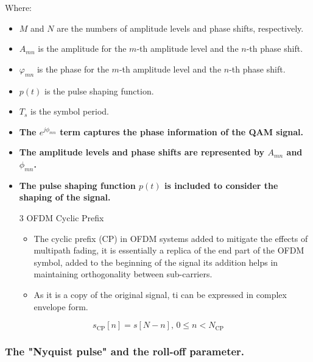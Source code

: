 \documentclass[colorlinks,11pt,a4paper,normalphoto,withhyper,ragged2e]{altareport}
\begin{document}
				Where:
				\begin{itemize}
					\item \(M\) and $N$ are the numbers of amplitude levels and phase shifts, respectively.
					\item \(A_{mn}\) is the amplitude for the \(m\)-th amplitude level and the \(n\)-th phase shift.
					\item \(\varphi_{mn}\) is the phase for the \(m\)-th amplitude level and the \(n\)-th phase shift.
					\item \(p(t)\) is the pulse shaping function.
					\item \(T_s\) is the symbol period.
					\item \textbf{The \(e^{j\phi_{mn}}\) term captures the phase information of the QAM signal.}
					\item \textbf{The amplitude levels and phase shifts are represented by \(A_{mn}\) and \(\phi_{mn}\).}
					\item \textbf{The pulse shaping function \(p(t)\) is included to consider the shaping of the signal.}
				\end{itemize}
				
				
				\pagebreak
				
				\begin{enumerate}
					\item[3] OFDM Cyclic Prefix
					\begin{itemize}[leftmargin=1cm]
						\item The cyclic prefix (CP) in OFDM systems added to mitigate the effects of multipath fading, it is essentially a replica of the end part of the OFDM symbol, added to the beginning of the signal its addition helps in maintaining orthogonality between sub-carriers.
						\item As it is a copy of the original signal, ti can be expressed in complex envelope form.
					\end{itemize}
				\end{enumerate}
				
				\begin{equation}
					s_{\text{CP}}[n] = s[N-n], \, 0 \leq n < N_{\text{CP}}
				\end{equation}
					
					
				\pagebreak
				
				
			
			
			\subsubsection{The "Nyquist pulse" and the roll-off parameter.}
\end{document}
